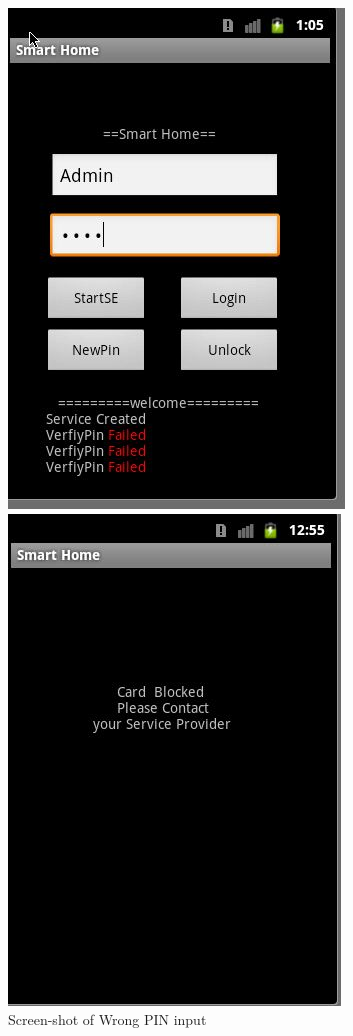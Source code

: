 \begin{figure}[!htb]
\begin{minipage}{0.49\linewidth}
  \includegraphics[width=0.8\linewidth]{Images/impl/3failed.jpg}
  \caption{Screen-shot of Wrong PIN input}
  \label{fig:sub1}
\end{minipage}
    \hfill
\begin{minipage}{0.49\linewidth}
  \includegraphics[width=0.8\linewidth]{Images/impl/UI3.jpg}

\end{minipage}
\end{figure}
